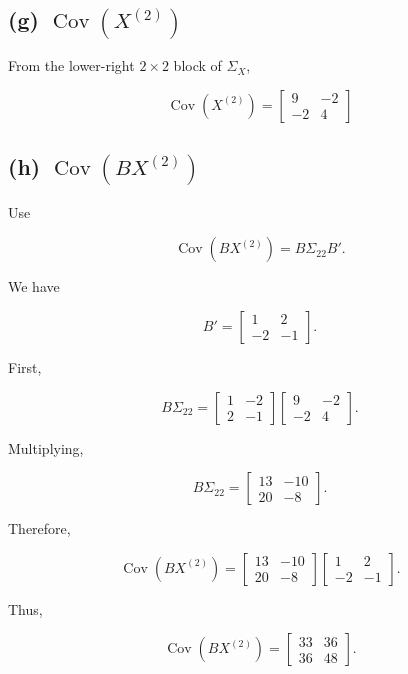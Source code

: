 \documentclass[12pt]{article}
\begin{document}
\subsection*{(g) $\operatorname{Cov}(X^{(2)})$}

From the lower-right $2\times2$ block of $\Sigma_X$,

\[
\boxed{
\operatorname{Cov}(X^{(2)})
=
\begin{bmatrix}
9&-2\\
-2&4
\end{bmatrix}}
\]

\subsection*{(h) $\operatorname{Cov}(BX^{(2)})$}

Use

\[
\operatorname{Cov}(BX^{(2)})
=
B\Sigma_{22}B'.
\]

We have

\[
B'=
\begin{bmatrix}
1&2\\
-2&-1
\end{bmatrix}.
\]

First,

\[
B\Sigma_{22}
=
\begin{bmatrix}
1&-2\\
2&-1
\end{bmatrix}
\begin{bmatrix}
9&-2\\
-2&4
\end{bmatrix}.
\]

Multiplying,

\[
B\Sigma_{22}
=
\begin{bmatrix}
13&-10\\
20&-8
\end{bmatrix}.
\]

Therefore,

\[
\operatorname{Cov}(BX^{(2)})
=
\begin{bmatrix}
13&-10\\
20&-8
\end{bmatrix}
\begin{bmatrix}
1&2\\
-2&-1
\end{bmatrix}.
\]

Thus,

\[
\operatorname{Cov}(BX^{(2)})
=
\begin{bmatrix}
33&36\\
36&48
\end{bmatrix}.
\]
\end{document}
